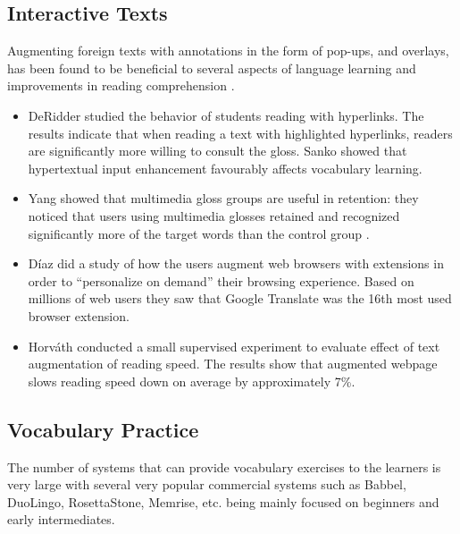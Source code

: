 \subsection{Interactive Texts}

Augmenting foreign texts with annotations in the form of pop-ups, and overlays, has been found to be beneficial to several aspects of language learning \cite{DeRidder02-Links} and improvements in reading comprehension \cite{Sanko06-Effects}.


\begin{itemize}
	\item DeRidder \cite{DeRidder02-Links} studied the behavior of students reading with hyperlinks. The results indicate that when reading a text with highlighted hyperlinks, readers are significantly more willing to consult the gloss. Sanko \cite{Sanko06-Effects} showed that hypertextual input enhancement favourably affects vocabulary learning.


	\item Yang showed that multimedia gloss groups are useful in retention: they noticed that users using multimedia glosses retained and recognized significantly more of the target words than the control group \cite{Yang09-Glosses}.


	\item D\'iaz \cite{Diaz15-Augmented} did a study of how the users augment web browsers with extensions in order to ``personalize on demand'' their browsing experience. Based on millions of web users they saw that Google Translate was the 16th most used browser extension.


	\item Horv\'ath conducted a small supervised experiment to evaluate effect of text
	augmentation of reading speed. The results show that augmented webpage slows
	reading speed down on average by approximately 7\%. \cite{Horva13-Enriching} 


\end{itemize}



\subsection{Vocabulary Practice}

The number of systems that can provide vocabulary exercises to the learners is very large with several very popular commercial systems such as Babbel, DuoLingo, RosettaStone, Memrise, etc. being mainly focused on beginners and early intermediates. 

